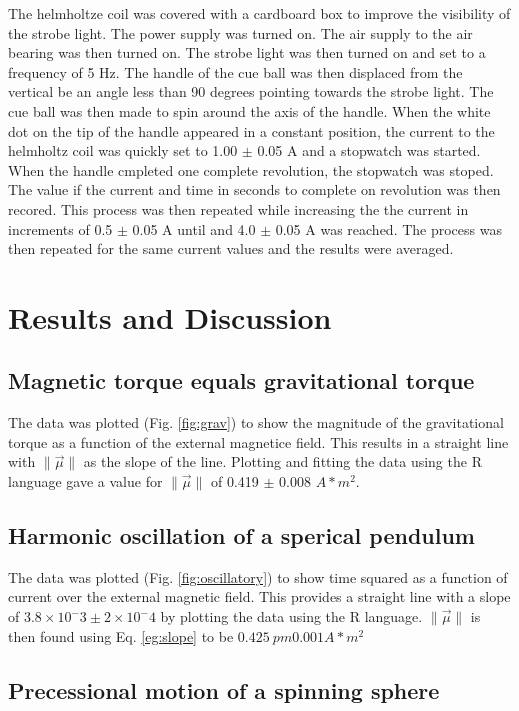\documentclass[twocolumn,secnumarabic,amssymb, nobibnotes, aps, pra]{revtex4}
\newcommand{\norm}[1]{\lVert#1\rVert}
\begin{document}
The helmholtze coil was covered with a cardboard box to improve the visibility of the strobe light.  The power supply was turned on.  The air supply to the air bearing was then turned on.  The strobe light was then turned on and set to a frequency of 5 Hz.  The handle of the cue ball was then displaced from the vertical be an angle less than 90 degrees pointing towards the strobe light.  The cue ball was then made to spin around the axis of the handle.  When the white dot on the tip of the handle appeared in a constant position, the current to the helmholtz coil was quickly set to 1.00 $\pm$ 0.05 A and a stopwatch was started.  When the handle cmpleted one complete revolution, the stopwatch was stoped.  The value if the current and time in seconds to complete on revolution was then recored.  This process was then repeated while increasing the the current in increments of 0.5 $\pm$ 0.05 A until and 4.0 $\pm$ 0.05 A was reached. The process was then repeated for the same current values and the results were averaged.

\section{Results and Discussion}
\subsection{Magnetic torque equals gravitational torque}

The data was plotted (Fig. \ref{fig:grav}) to show the magnitude of the gravitational torque as a function of the external magnetice field.  This results in a straight line with $\norm{\vec{\mu}}$ as the slope of the line. Plotting and fitting the data using the R language gave a value for $\norm{\vec{\mu}}$ of 0.419 $\pm$ 0.008 $A * m^2$.

\subsection{Harmonic oscillation of a sperical pendulum}

The data was plotted (Fig. \ref{fig:oscillatory}) to show time squared as a function of current over the external magnetic field.  This provides a straight line with a slope of $3.8\times 10^-3 \pm 2 \times 10^-4$ by plotting the data using the R language.  $\norm{\vec{\mu}} $ is then found using Eq. \ref{eg:slope} to be $0.425 \ pm 0.001 A * m^2$


\subsection{Precessional motion of a spinning sphere}
\end{document}
